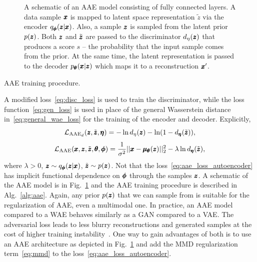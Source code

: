 \begin{figure}
\centering{}\caption{A schematic of an AAE model consisting of fully connected layers. A data sample $\pmb{{x}}$ is mapped to latent space representation $\tilde{z}$ via the encoder $q_{\pmb{{\phi}}}(\pmb{{z}}|\pmb{{x}})$. Also, a sample $\pmb{{z}}$ is sampled from the latent prior $p(\pmb{{z}})$. Both $\pmb{{z}}$ and $\tilde{\pmb{{z}}}$ are passed to the discriminator $d_{\eta}(\pmb{{z}})$ that produces a score $s$ -- the probability that the input sample comes from the prior. At the same time, the latent representation is passed to the decoder $p_{\pmb{{\theta}}}(\pmb{{x}}|\pmb{{z}})$ which maps it to a reconstruction $\pmb{{x}}'$.}
\label{fig:aae}
\end{figure}

\begin{algorithm}

\caption{AAE training procedure.}
\label{alg:aae}
\end{algorithm}

A modified loss~\eqref{eq:disc_loss} is used to train the discriminator, while the loss function~\eqref{eq:gen_loss} is used in place of the general Wasserstein distance in~\eqref{eq:general_wae_loss} for the training of the encoder and decoder. Explicitly,
\begin{equation} \label{eq:aae_loss_disc}
\mathcal{L}_{\text{AAE}_d}(\pmb{{z}},\tilde{\pmb{{z}}}, \pmb{{\eta}})= - \ln d_{\eta}(\pmb{{z}}) - \ln(1-d_{\pmb{{\eta}}}(\tilde{\pmb{{z}}})),
\end{equation}
\begin{equation} \label{eq:aae_loss_autoencoder}
\mathcal{L}_{\text{AAE}}(\pmb{{x}},\pmb{{z}},\tilde{\pmb{{z}}}, \pmb{{\theta}}, \pmb{{\phi}}) = \frac{1}{\sigma^2}||\pmb{{x}}-\pmb{{\mu}}_{\pmb{{\theta}}}(\pmb{{z}})||_{2}^{2} -\lambda\ln d_{\pmb{{\eta}}}(\tilde{\pmb{{z}}}),
\end{equation}
where $\lambda>0$, $\pmb{{z}} \sim q_{\pmb{{\phi}}}(\pmb{{z}}|\pmb{{x}})$, $\tilde{\pmb{{z}}} \sim p(\pmb{{z}})$. Not that the loss~\eqref{eq:aae_loss_autoencoder} has implicit functional dependence on $\pmb{{\phi}}$ through the samples $\pmb{{z}}$.  A schematic of the AAE model is in Fig.~\ref{fig:aae} and the AAE training procedure is described in Alg.~\ref{alg:aae}. Again, any prior $p(\pmb{{z}})$ that we can sample from is suitable for the regularization of AAE, even a multimodal one. In practice, an AAE model compared to a WAE behaves similarly as a GAN compared to a VAE. The adversarial loss leads to less blurry reconstructions and generated samples at the cost of higher training instability~\cite{tolstikhin2017wasserstein}. One way to gain advantages of both is to use an AAE architecture as depicted in Fig.~\ref{fig:aae} and add the MMD regularization term~\eqref{eq:mmd} to the loss~\eqref{eq:aae_loss_autoencoder}.

